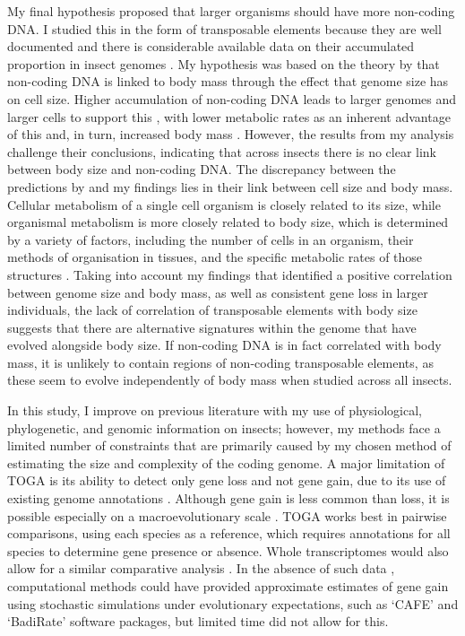 \documentclass[11pt]{article}
\begin{document}
My final hypothesis proposed that larger organisms should have more non-coding DNA. I studied this in the form of transposable elements because they are well documented and there is considerable available data on their accumulated proportion in insect genomes \citep{600TEs}. My hypothesis was based on the theory by \cite{Kozlowski} that non-coding DNA is linked to body mass through the effect that genome size has on cell size. Higher accumulation of non-coding DNA leads to larger genomes and larger cells to support this \citep{cavalier-smith}, with lower metabolic rates as an inherent advantage of this and, in turn, increased body mass \citep{DeLong, glazier-cell-metabolic-rate}. However, the results from my analysis challenge their conclusions, indicating that across insects there is no clear link between body size and non-coding DNA. The discrepancy between the predictions by \cite{Kozlowski} and my findings lies in their link between cell size and body mass. Cellular metabolism of a single cell organism is closely related to its size, while organismal metabolism is more closely related to body size, which is determined by a variety of factors, including the number of cells in an organism, their methods of organisation in tissues, and the specific metabolic rates of those structures \citep{organ-metabolism}. Taking into account my findings that identified a positive correlation between genome size and body mass, as well as consistent gene loss in larger individuals, the lack of correlation of transposable elements with body size suggests that there are alternative signatures within the genome that have evolved alongside body size. If non-coding DNA is in fact correlated with body mass, it is unlikely to contain regions of non-coding transposable elements, as these seem to evolve independently of body mass when studied across all insects. 

In this study, I improve on previous literature with my use of physiological, phylogenetic, and genomic information on insects; however, my methods face a limited number of constraints that are primarily caused by my chosen method of estimating the size and complexity of the coding genome. A major limitation of TOGA is its ability to detect only gene loss and not gene gain, due to its use of existing genome annotations \citep{TOGA}. Although gene gain is less common than loss, it is possible especially on a macroevolutionary scale \citep{gene-loss-vs-gain-2, evolution-by-gene-loss, geneloss_vs_gain}. TOGA works best in pairwise comparisons, using each species as a reference, which requires annotations for all species to determine gene presence or absence. Whole transcriptomes would also allow for a similar comparative analysis \citep{transcriptome}. In the absence of such data \citep{insectbase}, computational methods could have provided approximate estimates of gene gain using stochastic simulations under evolutionary expectations, such as `CAFE'\citep{CAFE} and `BadiRate' \citep{BadiRate} software packages, but limited time did not allow for this. 
\end{document}
